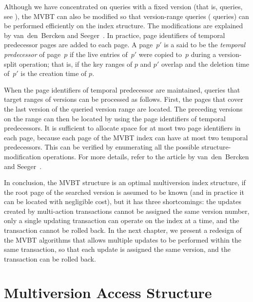 Although we have concentrated on queries with a fixed version 
(that is,  queries, see ),
the MVBT can also be modified so that version-range queries
( queries) can be performed efficiently on the index
structure.
The modifications are explained by van~den~Bercken and
Seeger~\cite{bercken:1996:multiversion}.
In practice, page identifiers of temporal predecessor pages are added
to each page. 
A page~$p'$ is a said to be the \emph{temporal predecessor} of page~$p$ if
the live entries of~$p'$ were copied to~$p$ during a
version-split operation; that is, if the key ranges of $p$
and $p'$ overlap and the deletion time of~$p'$ is the creation time of $p$.
 
When the page identifiers of temporal predecessor are maintained,   
queries that target ranges of versions can be processed as follows.
First, the pages that cover the last version of the queried version range 
are located. 
The preceding versions on the range can then be located by using the
page identifiers of temporal predecessors.
It is sufficient to allocate space for at most two page identifiers in
each page, because each page of the MVBT index can have at most two temporal
predecessors. 
This can be verified by enumerating all the possible
structure-modification operations.
For more details, refer to the article by
van~den~Bercken and Seeger~\cite{bercken:1996:multiversion}.

In conclusion, the MVBT structure is an optimal
multiversion index structure, if the root page of the searched version is
assumed to be known (and in practice it can be located with negligible cost),
but it has three shortcomings: the updates created by multi-action
transactions cannot be assigned the same version number, only a single
updating transaction can operate on the index at a time, and the transaction
cannot be rolled back.
In the next chapter, we present a redesign of the MVBT algorithms that
allows multiple updates to be performed within the same transaction, so that
each update is assigned the same version, and the transaction can be rolled
back.



\section{Multiversion Access Structure}
\label{sec:tsbmvbt:mvas}

